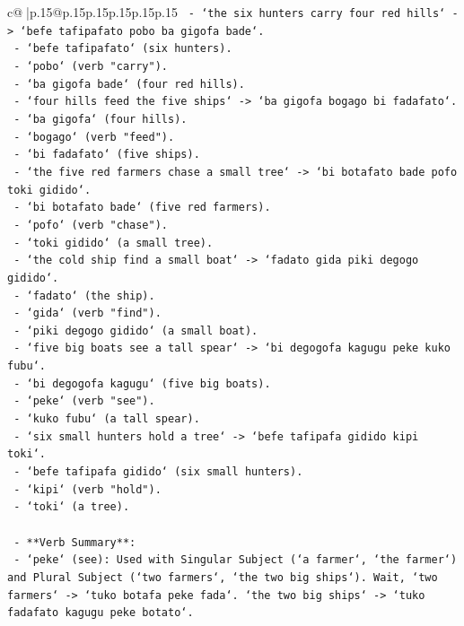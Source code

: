 \documentclass{article}
\begin{document}
{\begin{supertabular}{c@{$\;$}|p{.15\linewidth}@{}p{.15\linewidth}p{.15\linewidth}p{.15\linewidth}p{.15\linewidth}p{.15\linewidth}}
{{{\texttt{     {-} `the six hunters carry four red hills` {-}> `befe tafipafato pobo ba gigofa bade`.} \\
\texttt{       {-} `befe tafipafato` (six hunters).} \\
\texttt{       {-} `pobo` (verb "carry").} \\
\texttt{       {-} `ba gigofa bade` (four red hills).} \\
\texttt{     {-} `four hills feed the five ships` {-}> `ba gigofa bogago bi fadafato`.} \\
\texttt{       {-} `ba gigofa` (four hills).} \\
\texttt{       {-} `bogago` (verb "feed").} \\
\texttt{       {-} `bi fadafato` (five ships).} \\
\texttt{     {-} `the five red farmers chase a small tree` {-}> `bi botafato bade pofo toki gidido`.} \\
\texttt{       {-} `bi botafato bade` (five red farmers).} \\
\texttt{       {-} `pofo` (verb "chase").} \\
\texttt{       {-} `toki gidido` (a small tree).} \\
\texttt{     {-} `the cold ship find a small boat` {-}> `fadato gida piki degogo gidido`.} \\
\texttt{       {-} `fadato` (the ship).} \\
\texttt{       {-} `gida` (verb "find").} \\
\texttt{       {-} `piki degogo gidido` (a small boat).} \\
\texttt{     {-} `five big boats see a tall spear` {-}> `bi degogofa kagugu peke kuko fubu`.} \\
\texttt{       {-} `bi degogofa kagugu` (five big boats).} \\
\texttt{       {-} `peke` (verb "see").} \\
\texttt{       {-} `kuko fubu` (a tall spear).} \\
\texttt{     {-} `six small hunters hold a tree` {-}> `befe tafipafa gidido kipi toki`.} \\
\texttt{       {-} `befe tafipafa gidido` (six small hunters).} \\
\texttt{       {-} `kipi` (verb "hold").} \\
\texttt{       {-} `toki` (a tree).} \\
\\ 
\texttt{   {-} **Verb Summary**:} \\
\texttt{     {-} `peke` (see): Used with Singular Subject (`a farmer`, `the farmer`) and Plural Subject (`two farmers`, `the two big ships`). Wait, `two farmers` {-}> `tuko botafa peke fada`. `the two big ships` {-}> `tuko fadafato kagugu peke botato`.} \\
}}}
\end{supertabular}}
\end{document}
